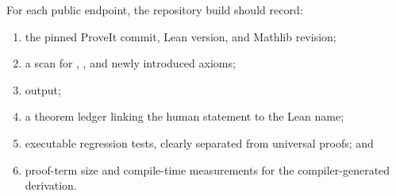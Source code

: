 For each public endpoint, the repository build should record:
\begin{enumerate}[label=(\arabic*)]
\item the pinned ProveIt commit, Lean version, and Mathlib revision;
\item a scan for , , and newly introduced axioms;
\item {} output;
\item a theorem ledger linking the human statement to the Lean name;
\item executable regression tests, clearly separated from universal proofs; and
\item proof-term size and compile-time measurements for the compiler-generated
      derivation.
\end{enumerate}
